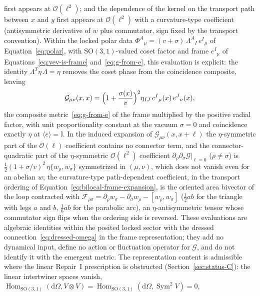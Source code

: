 first appears at $\mathcal O(\ell^{2})$; and the dependence of the kernel on the transport path
between $x$ and $y$ first appears at $\mathcal O(\ell^{2})$ with a curvature-type coefficient
(antisymmetric derivative of $w$ plus commutator, sign fixed by the transport convention). Within the locked polar data $\Phi^{A}{}_{\mu}=(v+\sigma)\,\Lambda^{A}{}_{I}\,e^{I}{}_{\mu}$ of Equation~\eqref{eq:polar}, with $\mathrm{SO}(3,1)$-valued coset factor and frame $e^{I}{}_{\mu}$ of Equations~\eqref{eq:vev-is-frame} and~\eqref{eq:g-from-e}, this evaluation is explicit: the identity $\Lambda^{T}\eta\,\Lambda=\eta$ removes the coset phase from the coincidence composite, leaving
\begin{equation}
  \label{eq:bilocal-coinc-locked}
  \mathcal{G}_{\mu\nu}(x,x)
  =
  \Bigl(1+\frac{\sigma(x)}{v}\Bigr)^{2}\eta_{IJ}\,e^{I}{}_{\mu}(x)\,e^{J}{}_{\nu}(x),
\end{equation}
the composite metric~\eqref{eq:g-from-e} of the frame multiplied by the positive radial factor, with unit proportionality constant at the vacuum $\sigma=0$ and coincidence exactly $\eta$ at $\langle e\rangle=\mathbb I$. In the induced expansion of $\mathcal{G}_{\mu\nu}(x,x+\ell)$ the $\eta$-symmetric part of the $\mathcal{O}(\ell)$ coefficient contains no connector term, and the connector-quadratic part of the $\eta$-symmetric $\mathcal{O}(\ell^{2})$ coefficient $\partial_{\rho}\partial_{\sigma}\mathcal{G}|_{\ell=0}$ ($\rho\neq\sigma$) is $\tfrac{1}{2}(1+\sigma/v)^{2}\,\eta\{w_{\rho},w_{\sigma}\}$ symmetrized in $(\mu,\nu)$, which does not vanish even for an abelian $w$; the curvature-type path-dependent coefficient, in the transport ordering of Equation~\eqref{eq:bilocal-frame-expansion}, is the oriented area bivector of the loop contracted with $\mathcal{F}_{\rho\sigma}=\partial_{\rho}w_{\sigma}-\partial_{\sigma}w_{\rho}-[w_{\rho},w_{\sigma}]$ ($\tfrac{1}{2}ab$ for the triangle with legs $a$ and $b$, $\tfrac{1}{6}ab$ for the parabolic arc), an $\eta$-antisymmetric tensor whose commutator sign flips when the ordering side is reversed. These evaluations are algebraic identities within the posited locked sector with the dressed connection~\eqref{eq:dressed-omega} in the frame representation; they add no dynamical input, define no action or fluctuation operator for $\mathcal{G}$, and do not identify it with the emergent metric.
The representation content is admissible where the linear Repair~I
prescription is obstructed (Section~\ref{sec:status-C}): the linear intertwiner spaces vanish,
$\operatorname{Hom}_{\mathrm{SO}(3,1)}(\mathrm{d}\Omega,V\otimes V)=\operatorname{Hom}_{\mathrm{SO}(3,1)}(\mathrm{d}\Omega,\operatorname{Sym}^{2}V)=0$,
